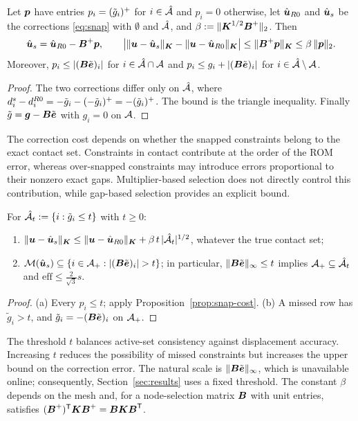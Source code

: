 \begin{proposition}\label{prop:snap-cost}
Let $\boldsymbol{p}$ have entries $p_i=(\tilde g_i)^{+}$ for $i\in\hat{\mathcal{A}}$ and $p_i=0$ otherwise, let $\hat{\boldsymbol{u}}_{R0}$ and $\hat{\boldsymbol{u}}_{s}$ be the corrections
\eqref{eq:snap} with $\emptyset$ and $\hat{\mathcal{A}}$, and $\beta:=\lVert \boldsymbol{K}^{1/2}\boldsymbol{B}^{+} \rVert_2$. Then
\begin{equation}\label{eq:snap-cost}
  \hat{\boldsymbol{u}}_{s}=\hat{\boldsymbol{u}}_{R0}-\boldsymbol{B}^{+}\boldsymbol{p},\qquad \big|\lVert \boldsymbol{u}-\hat{\boldsymbol{u}}_s \rVert_{\boldsymbol{K}}-\lVert \boldsymbol{u}-\hat{\boldsymbol{u}}_{R0} \rVert_{\boldsymbol{K}}\big|\le\lVert \boldsymbol{B}^{+}\boldsymbol{p} \rVert_{\boldsymbol{K}}\le\beta\,\lVert \boldsymbol{p} \rVert_2 .
\end{equation}
Moreover, $p_i\le|(\boldsymbol{B}\tilde{\boldsymbol{e}})_i|$ for $i\in\hat{\mathcal{A}}\cap\mathcal{A}$ and $p_i\le g_i+|(\boldsymbol{B}\tilde{\boldsymbol{e}})_i|$ for $i\in\hat{\mathcal{A}}\setminus\mathcal{A}$.
\end{proposition}
\begin{proof}
The two corrections differ only on $\hat{\mathcal{A}}$, where $d_i^{s}-d_i^{R0}=-\tilde g_i-(-\tilde g_i)^{+}=-(\tilde g_i)^{+}$. The bound is the triangle
inequality. Finally $\tilde g=\boldsymbol{g}-\boldsymbol{B}\tilde{\boldsymbol{e}}$ with $g_i=0$ on $\mathcal{A}$.
\end{proof}

The correction cost depends on whether the snapped constraints belong to the exact contact set. Constraints in contact contribute at the order of the ROM error, whereas over-snapped constraints may introduce errors proportional to their nonzero exact gaps. Multiplier-based selection does not directly control this contribution, while gap-based selection provides an explicit bound.

\begin{corollary}\label{cor:gap-rule}
For $\hat{\mathcal{A}}_t:=\{i:\tilde g_i\le t\}$ with $t\ge0$:
\begin{enumerate}
\item[(a)] $\lVert \boldsymbol{u}-\hat{\boldsymbol{u}}_s \rVert_{\boldsymbol{K}}\le\lVert \boldsymbol{u}-\hat{\boldsymbol{u}}_{R0} \rVert_{\boldsymbol{K}}+\beta\,t\,|\hat{\mathcal{A}}_t|^{1/2}$, whatever the true contact set;
\item[(b)] $\Miss(\uh_s)\subseteq\{i\in\Aplus:|(\mB\et)_i|>t\}$; in particular, $\lVert \boldsymbol{B}\tilde{\boldsymbol{e}} \rVert_\infty\le t$ implies $\mathcal{A}_{+}\subseteq\hat{\mathcal{A}}_t$ and
$\mathrm{eff}\le\frac2{\sqrt3}s$.
\end{enumerate}
\end{corollary}
\begin{proof}
(a) Every $p_i\le t$; apply Proposition~\ref{prop:snap-cost}. (b) A missed row has $\tilde g_i>t$, and $\tilde g_i=-(\boldsymbol{B}\tilde{\boldsymbol{e}})_i$ on $\mathcal{A}_{+}$.
\end{proof}

The threshold $t$ balances active-set consistency against displacement accuracy. Increasing $t$ reduces the possibility of missed constraints but increases the upper bound on the correction error. The natural scale is $\lVert \boldsymbol{B}\tilde{\boldsymbol{e}} \rVert_\infty$, which is unavailable online; consequently, Section~\ref{sec:results} uses a fixed threshold. The constant $\beta$ depends on the mesh and, for a node-selection matrix $\boldsymbol{B}$ with unit entries, satisfies $(\boldsymbol{B}^{+})^{\mathsf{T}}\boldsymbol{K}\boldsymbol{B}^{+}=\boldsymbol{B}\boldsymbol{K}\boldsymbol{B}^{\mathsf{T}}$.

